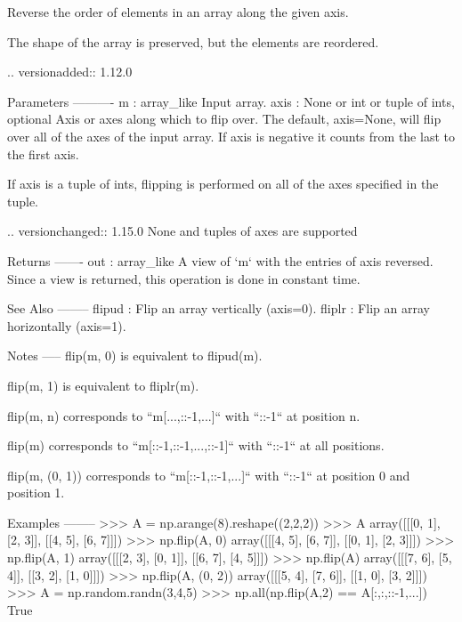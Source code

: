 \begin{DoxyVerb}Reverse the order of elements in an array along the given axis.

The shape of the array is preserved, but the elements are reordered.

.. versionadded:: 1.12.0

Parameters
----------
m : array_like
    Input array.
axis : None or int or tuple of ints, optional
     Axis or axes along which to flip over. The default,
     axis=None, will flip over all of the axes of the input array.
     If axis is negative it counts from the last to the first axis.

     If axis is a tuple of ints, flipping is performed on all of the axes
     specified in the tuple.

     .. versionchanged:: 1.15.0
        None and tuples of axes are supported

Returns
-------
out : array_like
    A view of `m` with the entries of axis reversed.  Since a view is
    returned, this operation is done in constant time.

See Also
--------
flipud : Flip an array vertically (axis=0).
fliplr : Flip an array horizontally (axis=1).

Notes
-----
flip(m, 0) is equivalent to flipud(m).

flip(m, 1) is equivalent to fliplr(m).

flip(m, n) corresponds to ``m[...,::-1,...]`` with ``::-1`` at position n.

flip(m) corresponds to ``m[::-1,::-1,...,::-1]`` with ``::-1`` at all
positions.

flip(m, (0, 1)) corresponds to ``m[::-1,::-1,...]`` with ``::-1`` at
position 0 and position 1.

Examples
--------
>>> A = np.arange(8).reshape((2,2,2))
>>> A
array([[[0, 1],
        [2, 3]],
       [[4, 5],
        [6, 7]]])
>>> np.flip(A, 0)
array([[[4, 5],
        [6, 7]],
       [[0, 1],
        [2, 3]]])
>>> np.flip(A, 1)
array([[[2, 3],
        [0, 1]],
       [[6, 7],
        [4, 5]]])
>>> np.flip(A)
array([[[7, 6],
        [5, 4]],
       [[3, 2],
        [1, 0]]])
>>> np.flip(A, (0, 2))
array([[[5, 4],
        [7, 6]],
       [[1, 0],
        [3, 2]]])
>>> A = np.random.randn(3,4,5)
>>> np.all(np.flip(A,2) == A[:,:,::-1,...])
True
\end{DoxyVerb}
 \mbox{\label{namespacenumpy_1_1lib_1_1function__base_a88404e4a9227049d8c2a36c4ea8d0a19}} 
